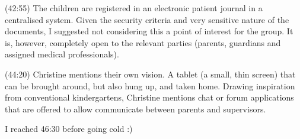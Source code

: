 (42:55) The children are registered in an electronic patient journal in a centralised system. Given the security criteria and very sensitive nature of the documents, I suggested not considering this a point of interest for the group. It is, however, completely open to the relevant parties (parents, guardians and assigned medical professionals).

(44:20) Christine mentions their own vision. A tablet (a small, thin screen) that can be brought around, but also hung up, and taken home. Drawing inspiration from conventional kindergartens, Christine mentions chat or forum applications that are offered to allow communicate between parents and supervisors.

I reached 46:30 before going cold :)